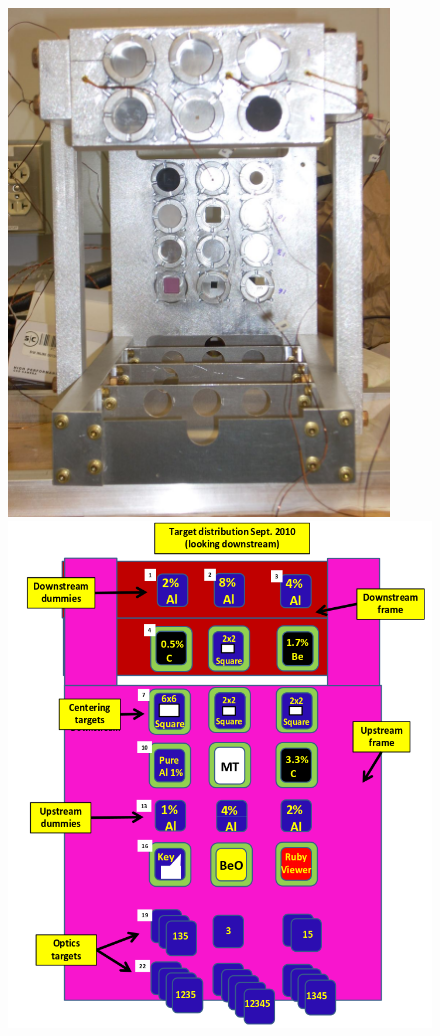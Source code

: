 \begin{figure}[h]
\begin{minipage}{0.42\textwidth}
  \centering
  \includegraphics[width=0.9\textwidth]{Pictures/dummy_target.JPG}
\end{minipage}
\begin{minipage}{0.48\textwidth}
\centering
\includegraphics[width=1\textwidth]{Pictures/dummy_target_schematic.png}

\end{minipage}
\end{figure}
